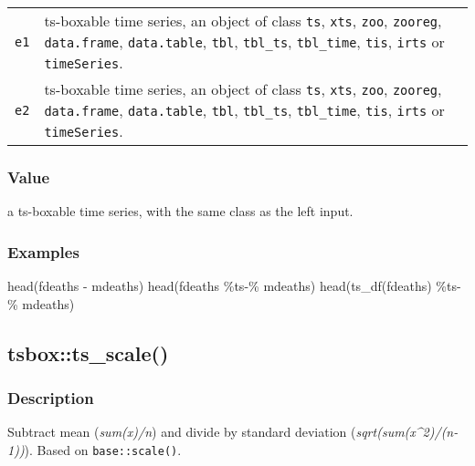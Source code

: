 \documentclass[
  letterpaper,
  DIV=11,
  numbers=noendperiod]{scrreport}
\newenvironment{Shaded}{\begin{snugshade}}{\end{snugshade}}
\newcommand{\FunctionTok}[1]{\textcolor[rgb]{0.28,0.35,0.67}{#1}}
\newcommand{\NormalTok}[1]{\textcolor[rgb]{0.00,0.23,0.31}{#1}}
\newcommand{\SpecialCharTok}[1]{\textcolor[rgb]{0.37,0.37,0.37}{#1}}
\begin{document}
\begin{longtable}[]{@{}ll@{}}
\toprule\noalign{}
\endhead
\bottomrule\noalign{}
\endlastfoot
\texttt{e1} & ts-boxable time series, an object of class \texttt{ts},
\texttt{xts}, \texttt{zoo}, \texttt{zooreg}, \texttt{data.frame},
\texttt{data.table}, \texttt{tbl}, \texttt{tbl\_ts}, \texttt{tbl\_time},
\texttt{tis}, \texttt{irts} or \texttt{timeSeries}. \\
\texttt{e2} & ts-boxable time series, an object of class \texttt{ts},
\texttt{xts}, \texttt{zoo}, \texttt{zooreg}, \texttt{data.frame},
\texttt{data.table}, \texttt{tbl}, \texttt{tbl\_ts}, \texttt{tbl\_time},
\texttt{tis}, \texttt{irts} or \texttt{timeSeries}. \\
\end{longtable}

\subsubsection{Value}\label{value-31}

a ts-boxable time series, with the same class as the left input.

\subsubsection{Examples}\label{examples-31}

\begin{Shaded}
\begin{Highlighting}[]
\FunctionTok{head}\NormalTok{(fdeaths }\SpecialCharTok{{-}}\NormalTok{ mdeaths)}
\FunctionTok{head}\NormalTok{(fdeaths }\SpecialCharTok{\%ts{-}\%}\NormalTok{ mdeaths)}
\FunctionTok{head}\NormalTok{(}\FunctionTok{ts\_df}\NormalTok{(fdeaths) }\SpecialCharTok{\%ts{-}\%}\NormalTok{ mdeaths)}
\end{Highlighting}
\end{Shaded}

\subsection{tsbox::ts\_scale()}\label{tsboxts_scale}

\subsubsection{Description}\label{description-32}

Subtract mean (\emph{sum(x)/n}) and divide by standard deviation
(\emph{sqrt(sum(x\^{}2)/(n-1))}). Based on \texttt{base::scale()}.
\end{document}
